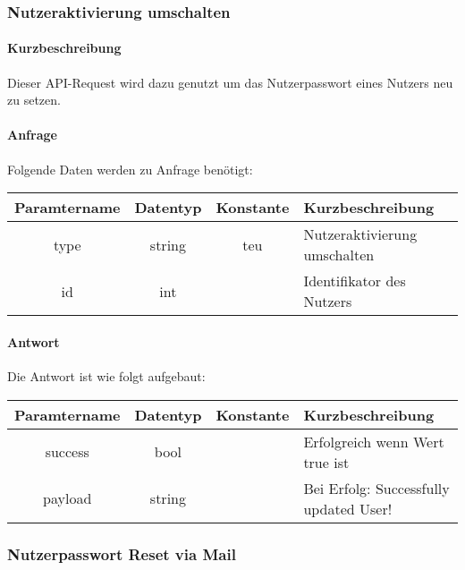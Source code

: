 \subsubsection{Nutzeraktivierung umschalten}
\paragraph{Kurzbeschreibung}Dieser API-Request wird dazu genutzt um das Nutzerpasswort eines Nutzers neu zu setzen.
\paragraph{Anfrage}Folgende Daten werden zu Anfrage benötigt:
\begin{table}[H]
	\begin{tabular}{|c|c|c|p{6.5cm}|}
		\hline
		\textbf{Paramtername} & \textbf{Datentyp} & \textbf{Konstante} & \textbf{Kurzbeschreibung}                                                                                               \\ \hline
		type                & string            & teu                & Nutzeraktivierung umschalten \\ \hline
		id                  & int               &                    & Identifikator des Nutzers \\ \hline
	\end{tabular}
\end{table}
\paragraph{Antwort}Die Antwort ist wie folgt aufgebaut:
\begin{table}[H]
	\begin{tabular}{|c|c|c|p{6.5cm}|}
		\hline
		\textbf{Paramtername} & \textbf{Datentyp} & \textbf{Konstante} & \textbf{Kurzbeschreibung}            \\ \hline                
		success             & bool             &                 & Erfolgreich wenn Wert {\glqq true\grqq} ist \\ \hline
		payload             & string           &                 & Bei Erfolg: {\glqq Successfully updated User!\grqq} \\ \hline
	\end{tabular}
\end{table}
\subsubsection{Nutzerpasswort Reset via Mail}

